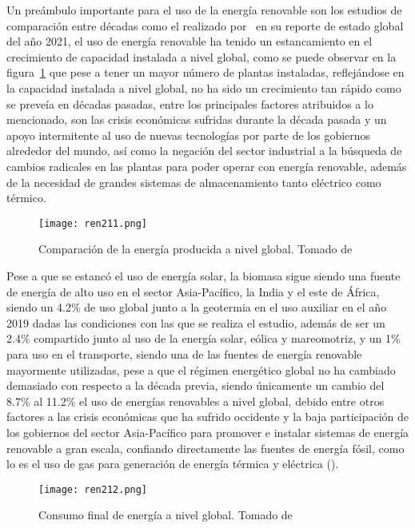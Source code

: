 Un preámbulo importante para el uso de la energía renovable son los estudios de comparación entre décadas como el realizado por~\textcite{ren212022global} en su reporte de estado global del año 2021, el uso de energía renovable ha tenido un estancamiento en el crecimiento de capacidad instalada a nivel global, como se puede observar en la figura~\ref{fig:ren211} que pese a tener un mayor número de plantas instaladas, reflejándose en la capacidad instalada a nivel global, no ha sido un crecimiento tan rápido como se preveía en décadas pasadas, entre los principales factores atribuidos a lo mencionado, son las crisis económicas sufridas durante la década pasada y un apoyo intermitente al uso de nuevas tecnologías por parte de los gobiernos alrededor del mundo, así como la negación del sector industrial a la búsqueda de cambios radicales en las plantas para poder operar con energía renovable, además de la necesidad de grandes sistemas de almacenamiento tanto eléctrico como térmico.

\begin{figure}[H]
\centering
\texttt{[image: ren211.png]}
\caption{Comparación de la energía producida a nivel global. \linebreak Tomado de \textcite{ren212022global}}
\label{fig:ren211}
\end{figure}

 Pese a que se estancó el uso de energía solar, la biomasa sigue siendo una fuente de energía de alto uso en el sector Asia-Pacífico, la India y el este de África, siendo un 4.2\% de uso global junto a la geotermia en el uso auxiliar en el año 2019 dadas las condiciones con las que se realiza el estudio, además de ser un 2.4\% compartido junto al uso de la energía solar, eólica y mareomotriz, y un 1\% para uso en el transporte, siendo una de las fuentes de energía renovable mayormente utilizadas, pese a que el régimen energético global no ha cambiado demasiado con respecto a la década previa, siendo únicamente un cambio del 8.7\% al 11.2\% el uso de energías renovables a nivel global, debido entre otros factores a las crisis económicas que ha sufrido occidente y la baja participación de los gobiernos del sector Asia-Pacífico para promover e instalar sistemas de energía renovable a gran escala, confiando directamente las fuentes de energía fósil, como lo es el uso de gas para generación de energía térmica y eléctrica (\cite{ren212022global}).

\begin{figure}[H]
\centering
\texttt{[image: ren212.png]}
\caption{Consumo final de energía a nivel global. \linebreak Tomado de \textcite{ren212022global}}
\label{fig:ren212}
\end{figure}

